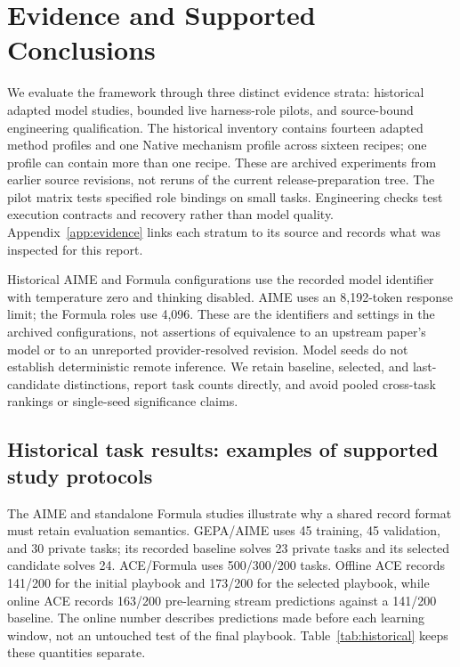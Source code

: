 \section{Evidence and Supported Conclusions}
\label{sec:evidence}

We evaluate the framework through three distinct evidence strata: historical adapted model studies, bounded live harness-role pilots, and source-bound engineering qualification. The historical inventory contains fourteen adapted method profiles and one Native mechanism profile across sixteen recipes; one profile can contain more than one recipe. These are archived experiments from earlier source revisions, not reruns of the current release-preparation tree. The pilot matrix tests specified role bindings on small tasks. Engineering checks test execution contracts and recovery rather than model quality. Appendix~\ref{app:evidence} links each stratum to its source and records what was inspected for this report.

Historical AIME and Formula configurations use the recorded  model identifier with temperature zero and thinking disabled. AIME uses an 8,192-token response limit; the Formula roles use 4,096. These are the identifiers and settings in the archived configurations, not assertions of equivalence to an upstream paper's model or to an unreported provider-resolved revision. Model seeds do not establish deterministic remote inference. We retain baseline, selected, and last-candidate distinctions, report task counts directly, and avoid pooled cross-task rankings or single-seed significance claims.

\subsection{Historical task results: examples of supported study protocols}
\label{sec:historical}
The AIME and standalone Formula studies illustrate why a shared record format must retain evaluation semantics. GEPA/AIME uses 45 training, 45 validation, and 30 private tasks; its recorded baseline solves 23 private tasks and its selected candidate solves 24. ACE/Formula uses 500/300/200 tasks. Offline ACE records 141/200 for the initial playbook and 173/200 for the selected playbook, while online ACE records 163/200 pre-learning stream predictions against a 141/200 baseline. The online number describes predictions made before each learning window, not an untouched test of the final playbook. Table~\ref{tab:historical} keeps these quantities separate.

